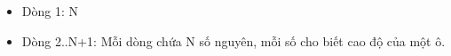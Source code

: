 \begin{itemize}
	\item     Dòng 1: N   
	\item     Dòng 2..N+1: Mỗi dòng chứa N số nguyên, mỗi số cho biết cao độ của một ô.   
\end{itemize}

\